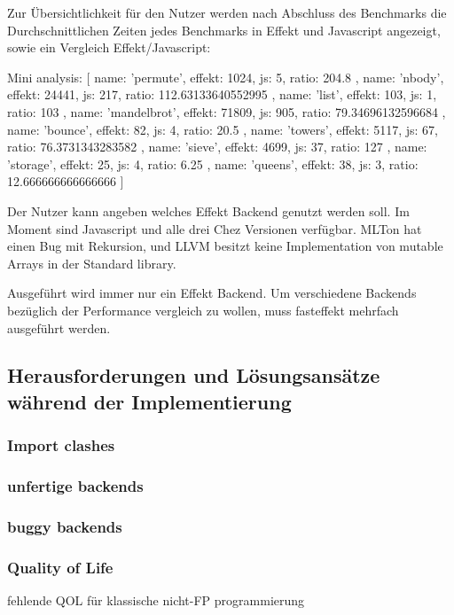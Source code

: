     Zur Übersichtlichkeit für den Nutzer werden nach Abschluss des Benchmarks die Durchschnittlichen Zeiten jedes Benchmarks in Effekt und Javascript angezeigt, sowie ein Vergleich Effekt/Javascript:
    
Mini analysis: [
{ name: 'permute', effekt: 1024, js: 5, ratio: 204.8 },
{ name: 'nbody', effekt: 24441, js: 217, ratio: 112.63133640552995 },
{ name: 'list', effekt: 103, js: 1, ratio: 103 },
{
name: 'mandelbrot',
effekt: 71809,
js: 905,
ratio: 79.34696132596684
},
{ name: 'bounce', effekt: 82, js: 4, ratio: 20.5 },
{ name: 'towers', effekt: 5117, js: 67, ratio: 76.3731343283582 },
{ name: 'sieve', effekt: 4699, js: 37, ratio: 127 },
{ name: 'storage', effekt: 25, js: 4, ratio: 6.25 },
{ name: 'queens', effekt: 38, js: 3, ratio: 12.666666666666666 }
] 

Der Nutzer kann angeben welches Effekt Backend genutzt werden soll. Im Moment sind Javascript und alle drei Chez Versionen verfügbar.
MLTon hat einen Bug mit Rekursion, und LLVM besitzt keine Implementation von mutable Arrays in der Standard library.

Ausgeführt wird immer nur ein Effekt Backend. Um verschiedene Backends bezüglich der Performance vergleich zu wollen, muss fasteffekt mehrfach ausgeführt werden.  

\subsection{Herausforderungen und Lösungsansätze während der Implementierung}

\subsubsection{Import clashes}

\subsubsection{unfertige backends}

\subsubsection{buggy backends}

\subsubsection{ Quality of Life }
fehlende QOL für klassische nicht-FP programmierung


